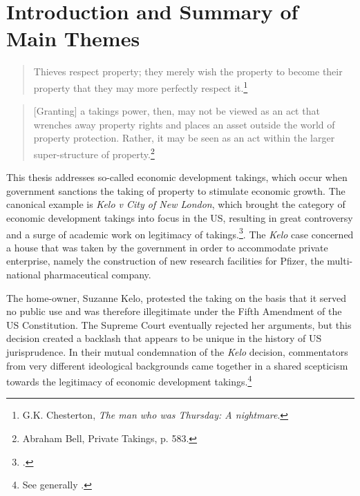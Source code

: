 \chapter{Introduction and Summary of Main Themes}\label{chap:intro}

\begin{quote}
Thieves respect property; they merely wish the property to become their property that they may more perfectly respect it.\footnote{G.K. Chesterton, {\it The man who was Thursday: A nightmare}.}
\end{quote}
\begin{quote}
[Granting] a takings power, then, may not be viewed as an act that wrenches away property rights and places an asset outside the world of property protection. Rather, it may be seen as an act within the larger super-structure of property.\footnote{Abraham Bell, Private Takings, p. 583.}
\end{quote}
%
%
%
%
This thesis addresses so-called economic development takings, which occur when government sanctions the taking of property to stimulate economic growth. The canonical example is {\it Kelo v City of New London}, which brought the category of economic development takings into focus in the US, resulting in great controversy and a surge of academic work on legitimacy of takings.\footcite{kelo05}. The {\it Kelo} case concerned a house that was taken by the government in order to accommodate private enterprise, namely the construction of new research facilities for Pfizer, the multi-national pharmaceutical company.

The home-owner, Suzanne Kelo, protested the taking on the basis that it served no public use and was therefore illegitimate under the Fifth Amendment of the US Constitution. The Supreme Court eventually rejected her arguments, but this decision created a backlash that appears to be unique in the history of US jurisprudence. In their mutual condemnation of the {\it Kelo} decision, commentators from very different ideological backgrounds came together in a shared scepticism towards the legitimacy of economic development takings.\footnote{See generally \cite{somin08}.}

